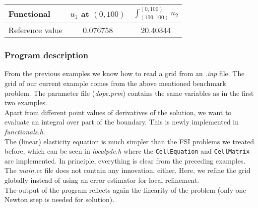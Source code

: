 \begin{table}[h]
\centering
\begin{tabular}{lcc}    
\hline
 Functional & $u_1$ at $(0,100)$ & $\int_{(100,100)}^{(0,100)} u_2$\\
\hline 
 Reference value & 0.076758 & 20.40344\\
\hline
\end{tabular}
\end{table}

\subsubsection{Program description}

From the previous examples we know how to read a grid from an \textit{.inp} file. The grid of our current example comes from the above mentioned benchmark problem. The parameter file (\textit{dope.prm}) contains the same variables as in the first two examples.\\
Apart from different point values of derivatives of the solution, we want to evaluate an integral over part of the boundary.   This is newly implemented in \textit{functionals.h}.\\
The (linear) elasticity equation is much simpler than the FSI problems we treated before, which can be seen in \textit{localpde.h} where the \texttt{CellEquation} and \texttt{CellMatrix} are implemented. In principle, everything is clear from the preceding examples.\\
The \textit{main.cc} file does not contain any innovation, either. Here, we refine the grid globally instead of using an error estimator for local refinement.\\
The output of the program reflects again the linearity of the problem (only one Newton step is needed for solution).\\
